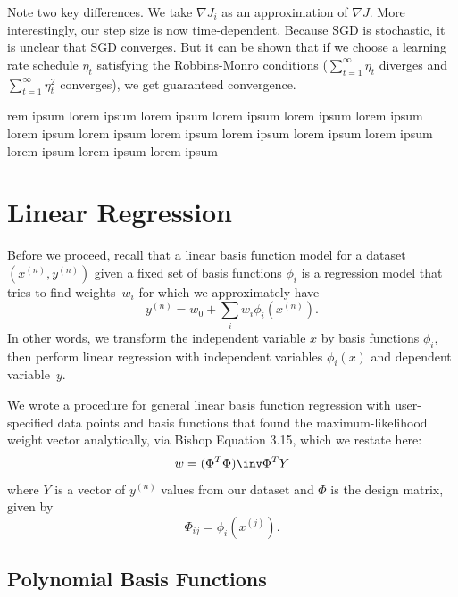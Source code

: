 \documentclass{amsart}
\begin{document}
Note two key differences. We take $\nabla J_i$ as an approximation of $\nabla J$. More interestingly, our step size is now time-dependent. Because SGD is stochastic, it is unclear that SGD converges. But it can be shown that if we choose a learning rate schedule $\eta_t$ satisfying the Robbins-Monro conditions ($\sum_{t=1}^\infty \eta_t$ diverges and $\sum_{t=1}^\infty \eta_t^2$ converges), we get guaranteed convergence.


rem ipsum lorem ipsum lorem ipsum lorem ipsum lorem ipsum lorem ipsum lorem ipsum lorem ipsum lorem ipsum lorem ipsum lorem ipsum lorem ipsum lorem ipsum lorem ipsum lorem ipsum 




\section{Linear Regression}

Before we proceed, recall that a linear basis function model for a dataset $(x^{(n)},y^{(n)})$ given a fixed set of basis functions $\phi_i$ is a regression model that tries to find weights~$w_i$ for which we approximately have
\[ y^{(n)} = w_0 + \sum_i w_i \phi_i(x^{(n)}). \]
In other words, we transform the independent variable $x$ by basis functions $\phi_i$, then perform linear regression with independent variables $\phi_i(x)$ and dependent variable~$y$.

We wrote a procedure for general linear basis function regression with user-specified data points and basis functions that found the maximum-likelihood weight vector analytically, via Bishop Equation 3.15, which we restate here:
\begin{equation}
w = (\Phi^T\Phi)\inv\Phi^T Y
\end{equation}
where $Y$ is a vector of $y^{(n)}$ values from our dataset and $\Phi$ is the design matrix, given by
\begin{equation}
\Phi_{ij} = \phi_i(x^{(j)}).
\end{equation}

\subsection{Polynomial Basis Functions}
\end{document}
